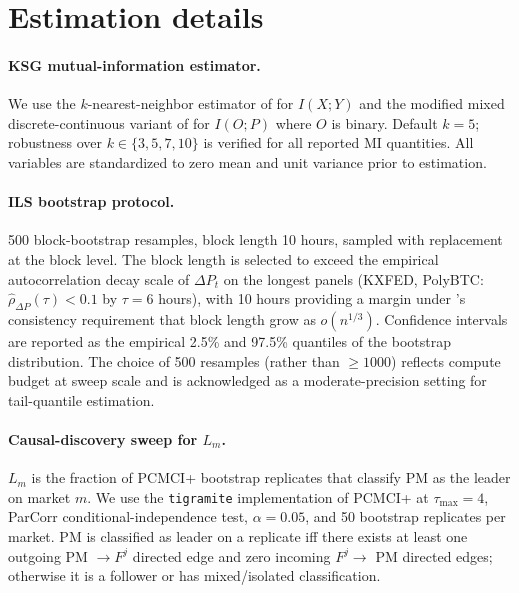 \documentclass{article}
\begin{document}
\section{Estimation details}
\label{app:est}

\paragraph{KSG mutual-information estimator.}
We use the $k$-nearest-neighbor estimator of \citet{kraskov2004estimating} for $I(X;Y)$ and the modified mixed discrete-continuous variant of \citet{ross2014mutual} for $I(O;P)$ where $O$ is binary. Default $k = 5$; robustness over $k \in \{3, 5, 7, 10\}$ is verified for all reported MI quantities. All variables are standardized to zero mean and unit variance prior to estimation.

\paragraph{ILS bootstrap protocol.}
500 block-bootstrap resamples, block length 10 hours, sampled with replacement at the block level. The block length is selected to exceed the empirical autocorrelation decay scale of $\Delta P_t$ on the longest panels (KXFED, PolyBTC: $\hat\rho_{\Delta P}(\tau) < 0.1$ by $\tau = 6$ hours), with 10 hours providing a margin under \citet{kunsch1989jackknife}'s consistency requirement that block length grow as $o(n^{1/3})$. Confidence intervals are reported as the empirical 2.5\% and 97.5\% quantiles of the bootstrap distribution. The choice of 500 resamples (rather than $\ge 1000$) reflects compute budget at sweep scale and is acknowledged as a moderate-precision setting for tail-quantile estimation.

\paragraph{Causal-discovery sweep for $L_m$.}
$L_m$ is the fraction of PCMCI+ bootstrap replicates that classify PM as the leader on market $m$. We use the \texttt{tigramite} implementation of PCMCI+ at $\tau_\text{max} = 4$, ParCorr conditional-independence test, $\alpha = 0.05$, and 50 bootstrap replicates per market. PM is classified as leader on a replicate iff there exists at least one outgoing PM $\to F^j$ directed edge and zero incoming $F^j \to$ PM directed edges; otherwise it is a follower or has mixed/isolated classification.
\end{document}
